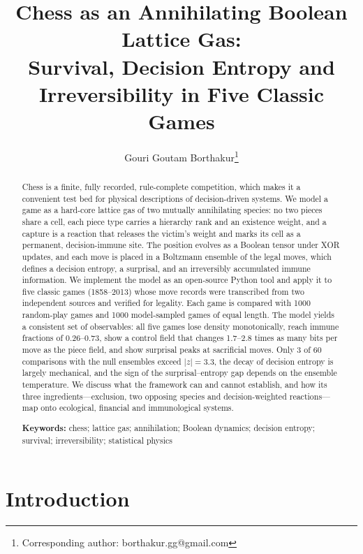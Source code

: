 \documentclass[11pt,a4paper]{article}
\title{Chess as an Annihilating Boolean Lattice Gas:\\
Survival, Decision Entropy and Irreversibility in Five Classic Games}
\author[1]{Gouri Goutam Borthakur\thanks{Corresponding author: borthakur.gg@gmail.com}}
\affil[1]{Department of Physics, Jorhat Institute of Science and Technology, Jorhat, Assam, India}
\date{}
\begin{document}
\maketitle

\begin{abstract}
\noindent
Chess is a finite, fully recorded, rule-complete competition, which makes it a convenient test bed for physical descriptions of decision-driven systems. We model a game as a hard-core lattice gas of two mutually annihilating species: no two pieces share a cell, each piece type carries a hierarchy rank and an existence weight, and a capture is a reaction that releases the victim's weight and marks its cell as a permanent, decision-immune site. The position evolves as a Boolean tensor under XOR updates, and each move is placed in a Boltzmann ensemble of the legal moves, which defines a decision entropy, a surprisal, and an irreversibly accumulated immune information. We implement the model as an open-source Python tool and apply it to five classic games (1858--2013) whose move records were transcribed from two independent sources and verified for legality. Each game is compared with 1000 random-play games and 1000 model-sampled games of equal length. The model yields a consistent set of observables: all five games lose density monotonically, reach immune fractions of 0.26--0.73, show a control field that changes 1.7--2.8 times as many bits per move as the piece field, and show surprisal peaks at sacrificial moves. Only 3 of 60 comparisons with the null ensembles exceed $|z|=3.3$, the decay of decision entropy is largely mechanical, and the sign of the surprisal--entropy gap depends on the ensemble temperature. We discuss what the framework can and cannot establish, and how its three ingredients---exclusion, two opposing species and decision-weighted reactions---map onto ecological, financial and immunological systems.

\medskip
\noindent\textbf{Keywords:} chess; lattice gas; annihilation; Boolean dynamics; decision entropy; survival; irreversibility; statistical physics
\end{abstract}

\section{Introduction}
\end{document}
